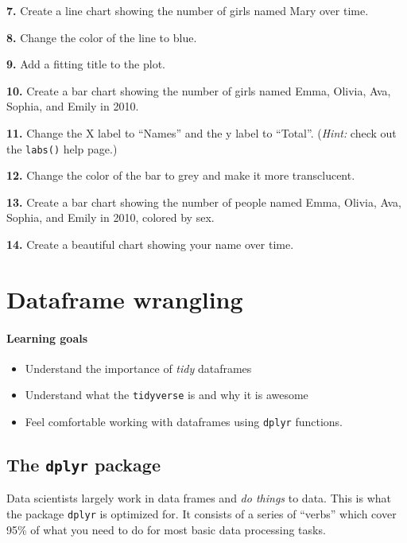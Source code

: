 \documentclass[
]{book}
\providecommand{\tightlist}{%
  \setlength{\itemsep}{0pt}\setlength{\parskip}{0pt}}
\begin{document}
\textbf{7.} Create a line chart showing the number of girls named Mary over time.

\textbf{8.} Change the color of the line to blue.

\textbf{9.} Add a fitting title to the plot.

\textbf{10.} Create a bar chart showing the number of girls named Emma, Olivia, Ava, Sophia, and Emily in 2010.

\textbf{11.} Change the X label to ``Names'' and the y label to ``Total''. (\emph{Hint:} check out the \texttt{labs()} help page.)

\textbf{12.} Change the color of the bar to grey and make it more transclucent.

\textbf{13.} Create a bar chart showing the number of people named Emma, Olivia, Ava, Sophia, and Emily in 2010, colored by sex.

\textbf{14.} Create a beautiful chart showing your name over time.

\hypertarget{dplyr}{%
\chapter{Dataframe wrangling}\label{dplyr}}

\hypertarget{learning-goals-6}{%
\subsubsection*{Learning goals}\label{learning-goals-6}}

\begin{itemize}
\tightlist
\item
  Understand the importance of \emph{tidy} dataframes
\item
  Understand what the \texttt{tidyverse} is and why it is awesome
\item
  Feel comfortable working with dataframes using \texttt{dplyr} functions.
\end{itemize}

\hypertarget{the-dplyr-package}{%
\section*{\texorpdfstring{The \texttt{dplyr} package}{The dplyr package}}\label{the-dplyr-package}}

Data scientists largely work in data frames and \emph{do things} to data. This is what the package \texttt{dplyr} is optimized for. It consists of a series of ``verbs'' which cover 95\% of what you need to do for most basic data processing tasks.
\end{document}
